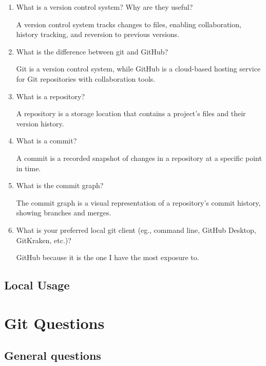 \documentclass[10pt,twocolumn]{article}
\begin{document}
\begin{enumerate}
    \item What is a version control system? Why are they useful?

    A version control system tracks changes to files, enabling collaboration, history tracking, and reversion to previous versions.
    
    \item What is the difference between git and GitHub?
    
    Git is a version control system, while GitHub is a cloud-based hosting service for Git repositories with collaboration tools.
    
    \item What is a repository?
    
    A repository is a storage location that contains a project's files and their version history.
    
    \item What is a commit?
    
    A commit is a recorded snapshot of changes in a repository at a specific point in time.
    
    \item What is the commit graph?
    
    The commit graph is a visual representation of a repository’s commit history, showing branches and merges.
    
    \item What is your preferred local git client (eg., command line, GitHub Desktop, GitKraken, etc.)?
    
    GitHub because it is the one I have the most exposure to.
\end{enumerate}

\subsection{Local Usage}

\section{Git Questions}

\subsection{General questions}
\end{document}
